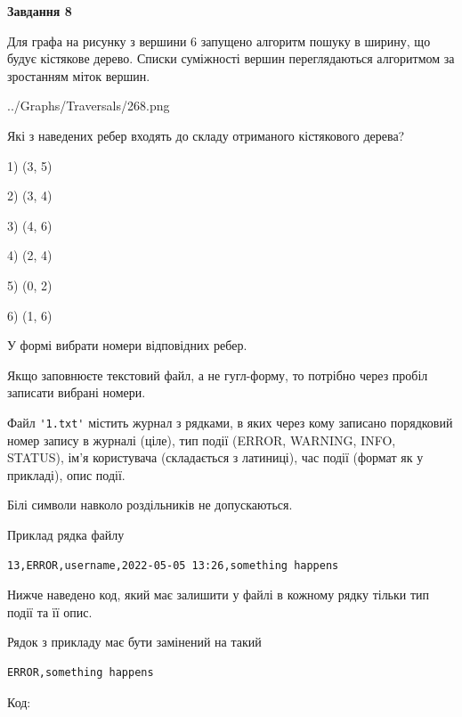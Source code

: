 \documentclass[12pt, ukrainian]{article}
\def\code#1{\Verb!#1!}
\begin{document}
{\begin {large}
{\begin {center}\textbf{Завдання 8}\end {center}}\par
Для графа на рисунку з вершини 6 запущено алгоритм пошуку в ширину, що будує кістякове дерево. Списки суміжності вершин переглядаються алгоритмом за зростанням міток вершин.\par
\begin{center}
	{../Graphs/Traversals/268.png}
\end{center}
\par Які з наведених ребер входять до складу отриманого кістякового дерева?\par
1) (3, 5)\par
2) (3, 4)\par
3) (4, 6)\par
4) (2, 4)\par
5) (0, 2)\par
6) (1, 6)\par
{\vskip 15pt} У формі вибрати номери відповідних ребер.


Якщо заповнюєте текстовий файл, а не гугл-форму, то потрібно через пробіл записа\-ти вибрані номери.\par
\newpage


Файл \code{'1.txt'} містить журнал з рядками, в яких через кому записано поряд\-ко\-вий номер запису в журналі (ціле), тип події (ERROR, WARNING, INFO, STATUS), ім'я користувача (складається з латиниці), час події (фор\-мат як у прикладі), опис події.

Білі символи навколо роздільників не допускаються.

Приклад рядка файлу



\begin{verbatim}
13,ERROR,username,2022-05-05 13:26,something happens
\end{verbatim}


Нижче наведено код, який має залишити у файлі в кожному рядку тільки тип події та її опис.

Рядок з прикладу має бути замінений на такий



\begin{verbatim}
ERROR,something happens
\end{verbatim}




Код:




\end{large}}
\end{document}
